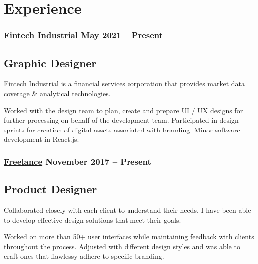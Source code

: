 \section*{Experience}
%
%
%
\subsubsection*{
  \href{https://www.linkedin.com/company/fintech-industrial/}{Fintech Industrial}
  \hspace*{\fill}
  May 2021 -- Present
}
\subsection*{Graphic Designer}
Fintech Industrial is a financial services corporation that provides market data coverage \& analytical technologies.
\smallskip
\begin{tasks}
  \task Worked with the design team to plan, create and prepare UI / UX designs for further processing on behalf of the development team.
  \task Participated in design sprints for creation of digital assets associated with branding.
  \task Minor software development in React.js.
\end{tasks}
%
%
\medskip
\subsubsection*{
  \href{https://bumbleboss.xyz/}{Freelance}
  \hspace*{\fill}
  November 2017 -- Present
}
\subsection*{Product Designer}
Collaborated closely with each client to understand their needs. I have been able to develop effective design solutions that meet their goals. 
\smallskip
\begin{tasks}
  \task Worked on more than 50+ user interfaces while maintaining feedback with clients throughout the process.
  \task Adjusted with different design styles and was able to craft ones that flawlessy adhere to specific branding.
\end{tasks}